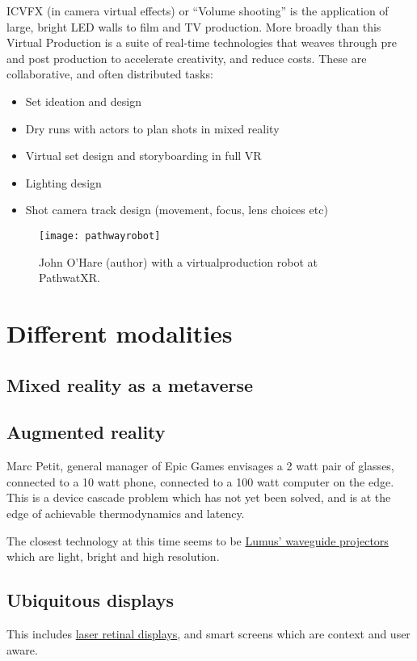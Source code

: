 ICVFX (in camera virtual effects) or ``Volume shooting'' is the application of large, bright LED walls to film and TV production. More broadly than this Virtual Production is a suite of real-time technologies that weaves through pre and post production to accelerate creativity, and reduce costs.
These are collaborative, and often distributed tasks:
\begin{itemize}
\item Set ideation and design
\item Dry runs with actors to plan shots in mixed reality
\item Virtual set design and storyboarding in full VR
\item Lighting design
\item Shot camera track design (movement, focus, lens choices etc)
\end{itemize}
\begin{figure}[ht]
  \centering
    \texttt{[image: pathwayrobot]}
  \caption{John O'Hare (author) with a virtualproduction robot at PathwatXR.}
  \label{fig:pathwayrobot}
\end{figure}
\section{Different modalities}
\subsection{Mixed reality as a metaverse}

\subsection{Augmented reality}
Marc Petit, general manager of Epic Games envisages a 2 watt pair of glasses, connected to a 10 watt phone, connected to a 100 watt computer on the edge. This is a device cascade problem which has not yet been solved, and is at the edge of achievable thermodynamics and latency.\par
The closest technology at this time seems to be \href{https://lumusvision.com/}{Lumus' waveguide projectors} which are light, bright and high resolution. 
\subsection{Ubiquitous displays}
This includes \href{https://skarredghost.com/2022/06/28/mojo-vision-contact-tested-eye/}{laser retinal displays}, and smart screens which are context and user aware.
